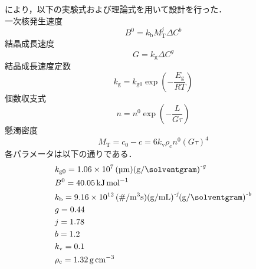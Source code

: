 \documentclass[a4j]{jsreport}
\begin{document}
\cite{晶析}により，以下の実験式および理論式を用いて設計を行った．\\
一次核発生速度
\begin{equation}
    B^0 = k_\mathrm{b} M_\mathrm{T}^j \varDelta C^b
\end{equation}
結晶成長速度
\begin{equation}
    G = k_\mathrm{g} \varDelta C^g
\end{equation}
結晶成長速度定数
\begin{equation}
    k_\mathrm{g} = k_\mathrm{g0} \exp \left( -\frac{E_\mathrm{g}}{RT} \right)
\end{equation}
個数収支式
\begin{equation}
    n=n^0 \exp \left( -\frac{L}{G\tau} \right)
\end{equation}
懸濁密度
\begin{equation}
    M_\mathrm{T} = c_0-c = 6k_\mathrm{v} \rho_\mathrm{c} n^0 (G\tau)^4
\end{equation}
各パラメータは以下の通りである．
\begin{align*}
    &k_\mathrm{g0} = 1.06\times10^7 \, \si{(\micro \meter)(\gram / \solventgram)^{\textit{-g}}} \\
    &B^{\mathrm{0}} = 40.05 \, \si{\kilo \joule \per \mole} \\
    &k_\mathrm{b} = 9.16 \times 10^{12} \, \si{(\# / \cubic \meter \second) (\gram / \milli \liter)^{\textit{-j}} (\gram / \solventgram)^{\textit{-b}}} \\
    &g = 0.44 \\
    &j = 1.78 \\
    &b = 1.2 \\
    &k_\mathrm{v} = 0.1 \\
    &\rho_\mathrm{c} = 1.32 \, \si{\gram \per \centi \metre \cubed}
\end{align*}
\end{document}
